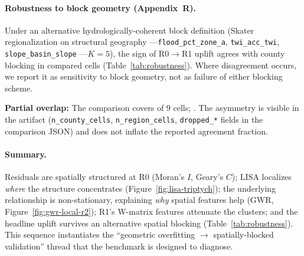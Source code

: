 
\paragraph{Robustness to block geometry (Appendix~R).}
Under an alternative hydrologically-coherent block definition
(Skater regionalization on structural geography%
---\texttt{flood\_pct\_zone\_a}, \texttt{twi\_acc\_twi},
\texttt{slope\_basin\_slope}%
---$K = 5$), the sign of R0$\to$R1 uplift agrees with county blocking
in  compared cells (Table~\ref{tab:robustness}).
Where disagreement occurs, we report it as sensitivity to block geometry,
not as failure of either blocking scheme.

\textbf{Partial overlap:}
The comparison covers  of 9 cells;
.
The asymmetry is visible in the artifact (\texttt{n\_county\_cells},
\texttt{n\_region\_cells}, \texttt{dropped\_*} fields in the comparison
JSON) and does not inflate the reported agreement fraction.



\paragraph{Summary.}
Residuals are spatially structured at R0 (Moran's $I$, Geary's $C$);
LISA localizes \emph{where} the structure concentrates
(Figure~\ref{fig:lisa-triptych});
the underlying relationship is non-stationary, explaining \emph{why}
spatial features help (GWR, Figure~\ref{fig:gwr-local-r2});
R1's W-matrix features attenuate the clusters;
and the headline uplift survives an alternative spatial blocking
(Table~\ref{tab:robustness}).
This sequence instantiates the ``geometric overfitting $\to$
spatially-blocked validation'' thread that the benchmark is designed
to diagnose.
